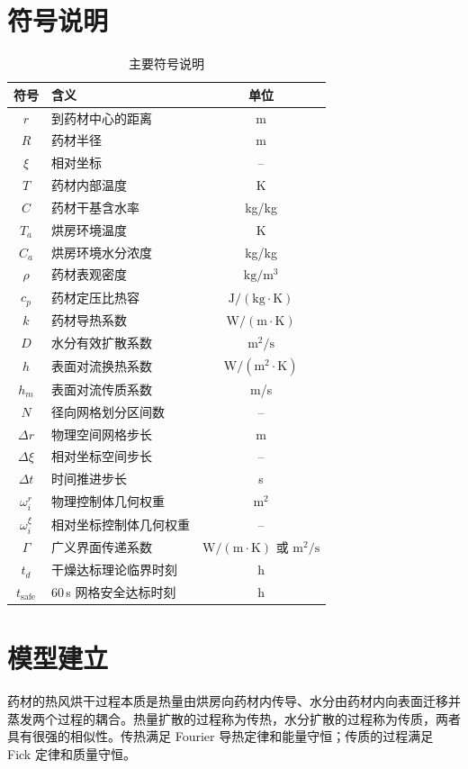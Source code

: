 \documentclass[12pt,a4paper]{ctexart}
\begin{document}
\section{符号说明}
\begin{table}[H]
\centering
\caption{主要符号说明}\label{tab:symbols}
\small
\renewcommand{\arraystretch}{1.1}
\begin{tabularx}{0.92\textwidth}{c<{\centering}X<{\raggedright}c<{\centering}}
\toprule
符号 & 含义 & 单位\\
\midrule
$r$ & 到药材中心的距离 & m\\
$R$ & 药材半径 & m\\
$\xi$ & 相对坐标 & --\\
$T$ & 药材内部温度 & K\\
$C$ & 药材干基含水率 & kg/kg\\
$T_a$ & 烘房环境温度 & K\\
$C_a$ & 烘房环境水分浓度 & kg/kg\\
$\rho$ & 药材表观密度 & $\mathrm{kg/m^3}$\\
$c_p$ & 药材定压比热容 & $\mathrm{J/(kg\cdot K)}$\\
$k$ & 药材导热系数 & $\mathrm{W/(m\cdot K)}$\\
$D$ & 水分有效扩散系数 & $\mathrm{m^2/s}$\\
$h$ & 表面对流换热系数 & $\mathrm{W/(m^2\cdot K)}$\\
$h_m$ & 表面对流传质系数 & m/s\\
$N$ & 径向网格划分区间数 & --\\
$\Delta r$ & 物理空间网格步长 & m\\
$\Delta\xi$ & 相对坐标空间步长 & --\\
$\Delta t$ & 时间推进步长 & s\\
$\omega_i^r$ & 物理控制体几何权重 & $\mathrm{m^2}$\\
$\omega_i^\xi$ & 相对坐标控制体几何权重 & --\\
$\Gamma$ & 广义界面传递系数 & $\mathrm{W/(m\cdot K)}$ 或 $\mathrm{m^2/s}$\\
$t_d$ & 干燥达标理论临界时刻 & h\\
$t_{\mathrm{safe}}$ & 60\,s 网格安全达标时刻 & h\\
\bottomrule
\end{tabularx}
\end{table}

\section{模型建立}
药材的热风烘干过程本质是热量由烘房向药材内传导、水分由药材内向表面迁移并蒸发两个过程的耦合。热量扩散的过程称为传热，水分扩散的过程称为传质，两者具有很强的相似性。传热满足 Fourier 导热定律和能量守恒；传质的过程满足 Fick 定律和质量守恒。
\end{document}
